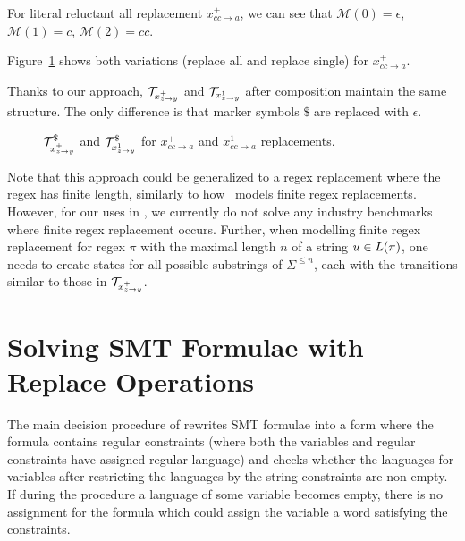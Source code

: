 \begin{example}
  For literal reluctant all replacement $x^{+}_{cc  \rightarrow a}$, we can see that $\mathcal{M}(0) = \epsilon$, $\mathcal{M}(1) = c$, $\mathcal{M}(2) = cc$.

  Figure~\ref{fig:literal_reluctant_replace} shows both variations (replace all and replace single) \nfts for $x^{+}_{cc \rightarrow a}$.

  Thanks to our approach, $\mathcal{T}_{x^{+}_{z \rightarrow y}}$ and $\mathcal{T}_{x^{1}_{z \rightarrow y}}$ after composition maintain the same structure.
  The only difference is that marker symbols $\$$ are replaced with $\epsilon$.

\begin{figure}[ht]
    \centering
    \quad
    \caption{
      $\mathcal{T}^\$_{x^{+}_{z \rightarrow y}}$ and $\mathcal{T}^\$_{x^{1}_{z \rightarrow y}}$ for $x^{+}_{cc \rightarrow a}$ and $x^{1}_{cc \rightarrow a}$ replacements.
    }
    \label{fig:literal_reluctant_replace}%
\end{figure}

\end{example}

Note that this approach could be generalized to a regex replacement where the regex has finite length, similarly to how~\cite{replace_nfts_model_ModelingRegularReplacementForStringConstraintSolving_DBLP:conf/nfm/FuL10} models finite regex replacements.
However, for our uses in \noodler, we currently do not solve any industry benchmarks where finite regex replacement occurs.
Further, when modelling finite regex replacement for regex $\pi$ with the maximal length $n$ of a string $u \in L(\pi)$, one needs to create states for all possible substrings of $\Sigma^{\leq n}$, each with the transitions similar to those in $\mathcal{T}_{x^{+}_{z \rightarrow y}}$.

\section{Solving SMT Formulae with Replace Operations}
\label{sec:string_solving_with_replace}

The main decision procedure of \noodler rewrites SMT formulae into a form where the formula contains regular constraints (where both the variables and regular constraints have assigned regular language) and \noodler checks whether the languages for variables after restricting the languages by the string constraints are non-empty.
If during the procedure a language of some variable becomes empty, there is no assignment for the formula which could assign the variable a word satisfying the constraints.

